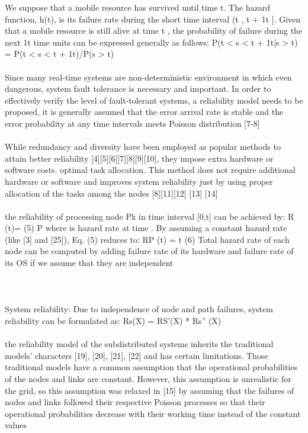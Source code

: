 \documentclass{cslthse-msc}
\begin{document}
\newpage
We suppose that a mobile resource has survived until time t. The hazard function, h(t), is its failure rate during the short time interval (t , t + 1t ]. Given that a mobile resource is still alive at time t , the probability of failure during the next 1t time units can be expressed generally as follows:
P(t < s < t + 1t|s > t) = P(t < s < t + 1t)/P(s > t) \cite{effTaskReplMobGrid}
\\\\
Since many real-time systems are non-deterministic environment in which even dangerous, system fault tolerance is necessary and important. In order to effectively verify the level of fault-tolerant systems, a reliability model needs to be proposed, it is generally assumed that the error arrival rate is stable and the error probability at any time intervals meets Poisson distribution [7-8] \cite{realTimeSchedAlgo}
\\\\
While redundancy and diversity have been employed as popular methods to attain better reliability [4][5][6][7][8][9][10], they impose extra hardware or software costs.
optimal task allocation. This method does not require additional hardware or software and improves system reliability just by using proper allocation of the tasks among the nodes [8][11][12] [13] [14] \cite{optTaskAllocationForMaxRel}
\\\\
the reliability of processing node Pk in
time interval [0,t] can be achieved by:
R (t)=            (5) P 
where       is hazard rate at time  . By assuming a constant hazard rate (like [3] and [25]), Eq. (5) reduces to:
RP (t) =       t (6) Total hazard rate of each node can be computed by adding failure rate of its hardware and failure rate of its OS if we assume that they are independent 
\\\\
\cite{discContRelModel}
\\\\
System reliability: Due to independence of node and path failures, system reliability can be formulated as: Rs(X) = RS’(X) * Rs” (X) \cite{optTaskAllocationForMaxRel}
\\\\
the reliability model of the subdistributed systems inherits the traditional models’ characters [19], [20], [21], [22] and has certain limitations. Those traditional models have a common assumption that the operational probabilities of the nodes and links are constant. However, this assumption is unrealistic for the grid, so this assumption was relaxed in [15] by assuming that the failures of nodes and links followed their respective Poisson processes so that their operational probabilities decrease with their working time instead of the constant values 
\end{document}
